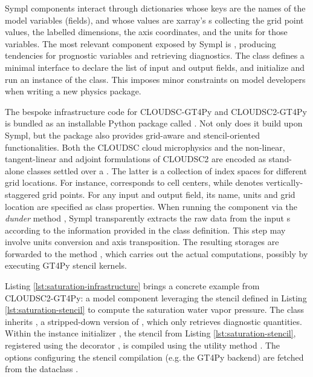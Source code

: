 \documentclass[gmd,manuscript,online]{copernicus}
\theoremstyle{theorem}
\theoremstyle{definition}
\theoremstyle{remark}
\theoremstyle{proposition}
\begin{document}
	Sympl components interact through dictionaries whose keys are the names of the model variables (fields), and whose values are xarray's s \citep{hoyer17} collecting the grid point values, the labelled dimensions, the axis coordinates, and the units for those variables. The most relevant component exposed by Sympl is , producing tendencies for prognostic variables and retrieving diagnostics. The class defines a minimal interface to declare the list of input and output fields, and initialize and run an instance of the class. This imposes minor constraints on model developers when writing a new physics package.

	The bespoke infrastructure code for CLOUDSC-GT4Py and CLOUDSC2-GT4Py is bundled as an installable Python package called . Not only does it build upon Sympl, but the package also provides grid-aware and stencil-oriented functionalities. Both the CLOUDSC cloud microphysics and the non-linear, tangent-linear and adjoint formulations of CLOUDSC2 are encoded as stand-alone  classes settled over a . The latter is a collection of index spaces for different grid locations. For instance,  corresponds to cell centers, while  denotes vertically-staggered grid points. For any input and output field, its name, units and grid location are specified as class properties. When running the component via the \emph{dunder} method , Sympl transparently extracts the raw data from the input s according to the information provided in the class definition. This step may involve units conversion and axis transposition. The resulting storages are forwarded to the method , which carries out the actual computations, possibly by executing GT4Py stencil kernels.

	Listing \ref{lst:saturation-infrastructure} brings a concrete example from CLOUDSC2-GT4Py: a model component leveraging the stencil defined in Listing \ref{lst:saturation-stencil} to compute the saturation water vapor pressure. The class inherits , a stripped-down version of , which only retrieves diagnostic quantities. Within the instance initializer , the stencil from Listing \ref{lst:saturation-stencil}, registered using the decorator , is compiled using the utility method . The options configuring the stencil compilation (e.g.\,the GT4Py backend) are fetched from the dataclass .
\end{document}
